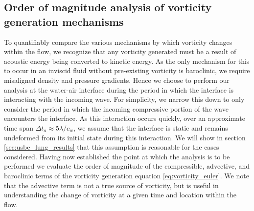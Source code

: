 \subsection{Order of magnitude analysis of vorticity generation mechanisms}
To quantifiably compare the various mechanisms by which vorticity
changes within the flow, we recognize that any vorticity generated
must be a result of acoustic energy being converted to kinetic
energy. As the only mechanism for this to occur in an inviscid fluid
without pre-existing vorticity is baroclinic, we require misaligned
density and pressure gradients. Hence we choose to perform our
analysis at the water-air interface during the period in which the
interface is interacting with the incoming wave. For simplicity, we
narrow this down to only consider the period in which the incoming
compressive portion of the wave encounters the interface. As this
interaction occurs quickly, over an approximate time span
$\Delta t_a\approx5\lambda/c_{w}$, we assume that the interface is
static and remains undeformed from its initial state during this
interaction. We will show in section \ref{sec:usbe_lung_results} that
this assumption is reasonable for the cases considered. Having now
established the point at which the analysis is to be performed we
evaluate the order of magnitude of the compressible, advective, and
baroclinic terms of the vorticity generation equation
\eqref{eq:vorticity_euler}. We note that the advective term is not a
true source of vorticity, but is useful in understanding the change of
vorticity at a given time and location within the flow.

